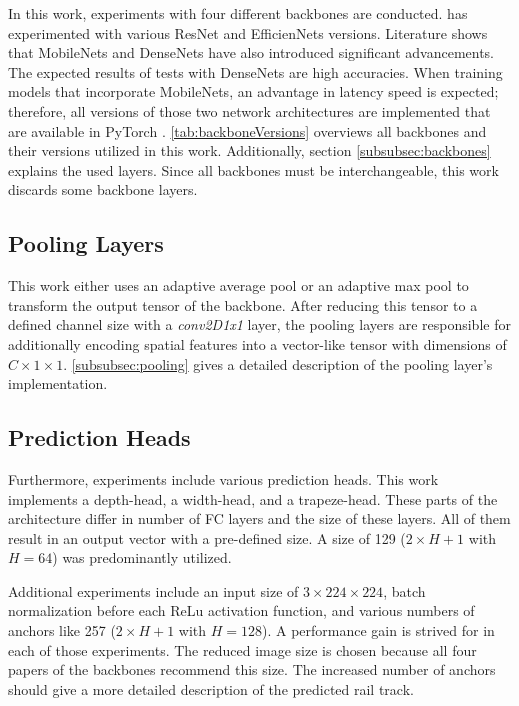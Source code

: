 In this work, experiments with four different backbones are conducted.
\cite{tepNet2024} has experimented with various ResNet and EfficienNets versions.
Literature shows that MobileNets and DenseNets have also introduced significant advancements.
The expected results of tests with DenseNets are high accuracies.
When training models that incorporate MobileNets, an advantage in latency speed is expected;
therefore, all versions of those two network architectures are implemented that are available in PyTorch \cite{pytorchmobilenetv3} \cite{pytorchdensenet}.
\autoref{tab:backboneVersions} overviews all backbones and their versions utilized in this work.
Additionally, section \autoref{subsubsec:backbones} explains the used layers.
Since all backbones must be interchangeable, this work discards some backbone layers.

\subsection{Pooling Layers}

This work either uses an adaptive average pool or an adaptive max pool to transform the output tensor of the backbone.
After reducing this tensor to a defined channel size with a \textit{conv2D1x1} layer, the pooling layers are responsible for additionally encoding spatial features into a vector-like tensor with dimensions of $C \times 1 \times 1$.
\autoref{subsubsec:pooling} gives a detailed description of the pooling layer's implementation.

\subsection{Prediction Heads}

Furthermore, experiments include various prediction heads.
This work implements a depth-head, a width-head, and a trapeze-head.
These parts of the architecture differ in number of \ac{FC} layers and the size of these layers.
All of them result in an output vector with a pre-defined size.
A size of 129 ($2 \times H + 1$ with $H = 64$) was predominantly utilized.

\vspace{1cm}

Additional experiments include an input size of $3 \times 224 \times 224$, batch normalization before each ReLu activation function, and various numbers of anchors like 257 ($2 \times H + 1$ with $H = 128$).
A performance gain is strived for in each of those experiments.
The reduced image size is chosen because all four papers of the backbones recommend this size.
The increased number of anchors should give a more detailed description of the predicted rail track.